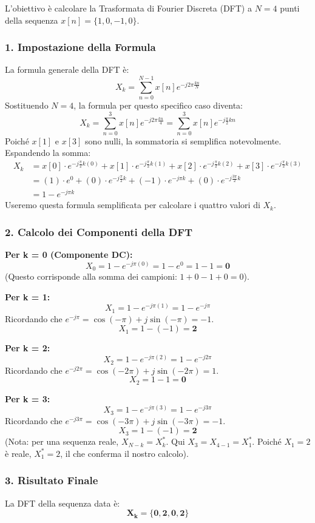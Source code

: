 
\begin{soluzione}{11}
    L'obiettivo è calcolare la Trasformata di Fourier Discreta (DFT) a $N=4$ punti della sequenza $x[n] = \{1, 0, -1, 0\}$.
    
    \subsubsection*{1. Impostazione della Formula}
    La formula generale della DFT è:
    \[
        X_k = \sum_{n=0}^{N-1} x[n] e^{-j2\pi\frac{kn}{N}}
    \]
    Sostituendo $N=4$, la formula per questo specifico caso diventa:
    \[
        X_k = \sum_{n=0}^{3} x[n] e^{-j2\pi\frac{kn}{4}} = \sum_{n=0}^{3} x[n] e^{-j\frac{\pi}{2}kn}
    \]
    Poiché $x[1]$ e $x[3]$ sono nulli, la sommatoria si semplifica notevolmente. Espandendo la somma:
    \begin{align*}
        X_k &= x[0] \cdot e^{-j\frac{\pi}{2}k(0)} + x[1] \cdot e^{-j\frac{\pi}{2}k(1)} + x[2] \cdot e^{-j\frac{\pi}{2}k(2)} + x[3] \cdot e^{-j\frac{\pi}{2}k(3)} \\
        &= (1) \cdot e^{0} + (0) \cdot e^{-j\frac{\pi}{2}k} + (-1) \cdot e^{-j\pi k} + (0) \cdot e^{-j\frac{3\pi}{2}k} \\
        &= 1 - e^{-j\pi k}
    \end{align*}
    Useremo questa formula semplificata per calcolare i quattro valori di $X_k$.

    \subsubsection*{2. Calcolo dei Componenti della DFT}
    
    \textbf{Per k = 0 (Componente DC):}
    \[
        X_0 = 1 - e^{-j\pi(0)} = 1 - e^{0} = 1 - 1 = \mathbf{0}
    \]
    (Questo corrisponde alla somma dei campioni: $1+0-1+0 = 0$).
    
    \textbf{Per k = 1:}
    \[
        X_1 = 1 - e^{-j\pi(1)} = 1 - e^{-j\pi}
    \]
    Ricordando che $e^{-j\pi} = \cos(-\pi) + j\sin(-\pi) = -1$.
    \[
        X_1 = 1 - (-1) = \mathbf{2}
    \]
    
    \textbf{Per k = 2:}
    \[
        X_2 = 1 - e^{-j\pi(2)} = 1 - e^{-j2\pi}
    \]
    Ricordando che $e^{-j2\pi} = \cos(-2\pi) + j\sin(-2\pi) = 1$.
    \[
        X_2 = 1 - 1 = \mathbf{0}
    \]
    
    \textbf{Per k = 3:}
    \[
        X_3 = 1 - e^{-j\pi(3)} = 1 - e^{-j3\pi}
    \]
    Ricordando che $e^{-j3\pi} = \cos(-3\pi) + j\sin(-3\pi) = -1$.
    \[
        X_3 = 1 - (-1) = \mathbf{2}
    \]
    (Nota: per una sequenza reale, $X_{N-k} = X_k^*$. Qui $X_3 = X_{4-1} = X_1^*$. Poiché $X_1=2$ è reale, $X_1^*=2$, il che conferma il nostro calcolo).
    
    \subsubsection*{3. Risultato Finale}
    La DFT della sequenza data è:
    \[
        \mathbf{X_k = \{0, 2, 0, 2\}}
    \]

\end{soluzione}